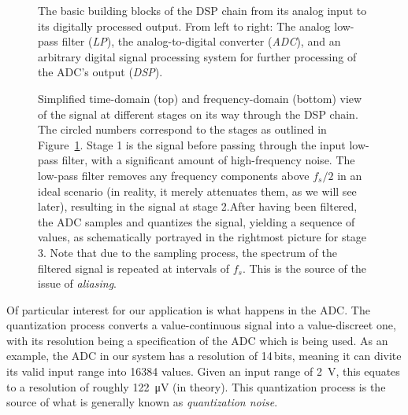 \begin{figure}
    \centering
    
    \caption[The DSP Chain]{%
        The  basic  building   blocks  of  the  DSP  chain   from  its  analog
        input  to its  digitally processed  output.  From  left to  right: The
        analog  low-pass filter  (\emph{LP}), the  analog-to-digital converter
        (\emph{ADC}), and  an arbitrary  digital signal processing  system for
        further processing of the ADC's output (\emph{DSP}).%
    }
    \label{fig:dspChain:blocks}
\end{figure}

\begin{figure}
    \centering
    
    
    \caption[Signals Passing Through the DSP Chain (Simplified)]{%
        Simplified  time-domain  (top)   and  frequency-domain  (bottom)  view
        of  the  signal  at  different  stages on  its  way  through  the  DSP
        chain. The  circled  numbers  correspond  to the  stages  as  outlined
        in  Figure~\ref{fig:dspChain:blocks}.  Stage  1 is  the signal  before
        passing through the  input low-pass filter, with  a significant amount
        of  high-frequency noise. The  low-pass filter  removes any  frequency
        components  above ${f_s}/{2}$  in an  ideal scenario  (in reality,  it
        merely attenuates them, as we will see later), resulting in the signal
        at  stage  2.\protect\newline  After  having been  filtered,  the  ADC
        samples and  quantizes the signal,  yielding a sequence of  values, as
        schematically portrayed  in the rightmost  picture for stage  3.  Note
        that due to the sampling process,  the spectrum of the filtered signal
        is repeated at intervals of $f_s$. This  is the source of the issue of
        \emph{aliasing}.%
    }
    \label{fig:dspChain:signals}
\end{figure}

Of particular  interest for our  application is  what happens in  the ADC. The
quantization process converts a  value-continuous signal into a value-discreet
one,  with its  resolution being  a specification  of the  ADC which  is being
used. As an example, the ADC in our system has a resolution of \num{14}\,bits,
meaning it can divite its valid  input range into \num{16384} values. Given an
input  range of  \SI{2}{\volt_}, this  equates to  a resolution  of
roughly \SI{122}{\micro\volt}  (in theory). This  quantization process  is the
source of what is generally known as \emph{quantization noise}.

